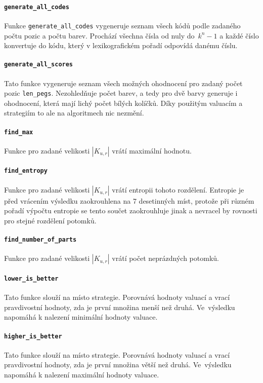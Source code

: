 \documentclass[12pt,a4paper]{article}
\begin{document}
\paragraph{\texttt{generate\_all\_codes}}
Funkce \texttt{generate\_all\_codes} vygeneruje seznam všech kódů podle zadaného počtu pozic a počtu barev. Prochází všechna čísla od nuly do~$k^n - 1$ a každé číslo konvertuje do kódu, který v lexikografickém pořadí odpovídá danému číslu. 

\paragraph{\texttt{generate\_all\_scores}}
Tato funkce vygeneruje seznam všech možných ohodnocení pro zadaný počet pozic \texttt{len\_pegs}. Nezohledňuje počet barev, a tedy pro dvě barvy generuje i ohodnocení, která mají lichý počet bílých kolíčků. Díky použitým valuacím a strategiím to ale na algoritmech nic nezmění.

\paragraph{\texttt{find\_max}}
Funkce pro zadané velikosti $|K_{u,r}|$ vrátí maximální hodnotu. 

\paragraph{\texttt{find\_entropy}}
Funkce pro zadané velikosti $|K_{u,r}|$ vrátí entropii tohoto rozdělení. Entropie je před vrácením výsledku zaokrouhlena na 7 desetinných míst, protože při různém pořadí výpočtu entropie se tento součet zaokrouhluje jinak a nevracel by rovnosti pro stejné rozdělení potomků.

\paragraph{\texttt{find\_number\_of\_parts}}
Funkce pro zadané velikosti $|K_{u,r}|$ vrátí počet neprázdných potomků.

\paragraph{\texttt{lower\_is\_better}}
Tato funkce slouží na místo strategie. Porovnává hodnoty valuací a vrací pravdivostní hodnoty, zda je první množina menší než druhá. Ve~výsledku napomáhá k nalezení minimální hodnoty valuace.

\paragraph{\texttt{higher\_is\_better}}
Tato funkce slouží na místo strategie. Porovnává hodnoty valuací a vrací pravdivostní hodnoty, zda je první množina větší než druhá. Ve~výsledku napomáhá k nalezení maximální hodnoty valuace.
\end{document}
